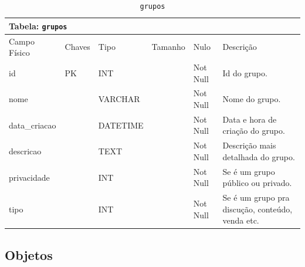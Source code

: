 \documentclass[12pt,a4paper]{article}
\begin{document}
\begin{center}
\begin{table}[h!]
	\caption{\texttt{grupos}}
	\label{tabela:grupos}
	\begin{tabular}{|p{2.5cm}|p{1cm}|p{1.25cm}|p{1.75cm}|p{1.25cm}|p{6cm}|}\hline	
		\multicolumn{6}{|p{16cm}|}{\cellcolor{cinzaClaro}  \centering Tabela: \texttt{grupos}} \\ \hline %
		{\small Campo Físico}   & {\small Chaves} & {\small Tipo} & {\small Tamanho} & {\small Nulo} & {\small Descrição}\\\hline %
		
		{\tiny id} & {\tiny PK} & {\tiny INT} & {\tiny } & {\tiny Not Null} &{\tiny Id do grupo.}\\\hline
		{\tiny nome} & {\tiny } & {\tiny VARCHAR} & {\tiny } & {\tiny Not Null} &{\tiny Nome do grupo.}\\\hline
		{\tiny data\_criacao} & {\tiny } & {\tiny DATETIME} & {\tiny } & {\tiny Not Null} &{\tiny Data e hora de criação do grupo.}\\\hline
		{\tiny descricao} & {\tiny } & {\tiny TEXT} & {\tiny } & {\tiny Not Null} &{\tiny Descrição mais detalhada do grupo.}\\\hline
		{\tiny privacidade} & {\tiny } & {\tiny INT} & {\tiny } & {\tiny Not Null} &{\tiny Se é um grupo público ou privado.
}\\\hline
		{\tiny tipo} & {\tiny } & {\tiny INT} & {\tiny } & {\tiny Not Null} &{\tiny Se é um grupo pra discução, conteúdo, venda etc.}\\\hline
			
	\end{tabular}
\end{table}	
\end{center}



\subsection{Objetos}

\end{document}
